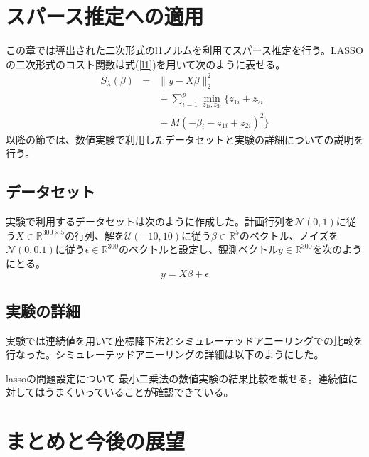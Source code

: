 \documentclass[paper]{ieicej}
\begin{document}
\section{スパース推定への適用}
この章では導出された二次形式のl1ノルムを利用てスパース推定を行う。LASSOの二次形式のコスト関数は式(\ref{l1})を用いて次のように表せる。
\begin{eqnarray}
  S_{\lambda}(\beta) &=& \|y-X\beta\|^{2}_{2} \nonumber \\
  & & \mbox{}+\sum_{i=1}^{p}{\min_{z_{1i},z_{2i}}{\{z_{1i}+z_{2i}}} \nonumber \\
  & & \mbox{}+M(-\beta_{i}-z_{1i}+z_{2i})^{2}\} \label{lasso_cost}
\end{eqnarray}
以降の節では、数値実験で利用したデータセットと実験の詳細についての説明を行う。

\subsection{データセット}
実験で利用するデータセットは次のように作成した。計画行列を$\mathcal{N}(0,1)$に従う$X\in\mathbb{R}^{300\times 5}$の行列、解を$\mathcal{U}(-10,10)$に従う$\beta\in\mathbb{R}^{5}$のベクトル、ノイズを$\mathcal{N}(0,0.1)$に従う$\epsilon\in\mathbb{R}^{300}$のベクトルと設定し、観測ベクトル$y\in\mathbb{R}^{300}$を次のようにとる。
\begin{equation}
  y = X\beta +\epsilon
\end{equation}

\subsection{実験の詳細}
実験では連続値を用いて座標降下法とシミュレーテッドアニーリングでの比較を行なった。シミュレーテッドアニーリングの詳細は以下のようにした。

lassoの問題設定について
最小二乗法の数値実験の結果比較を載せる。連続値に対してはうまくいっていることが確認できている。

\section{まとめと今後の展望}

\ack %

%
%
\begin{thebibliography}{99}%
\bibitem{}
\end{thebibliography}

\appendix
\section{}

\begin{biography}
\end{biography}
\end{document}
